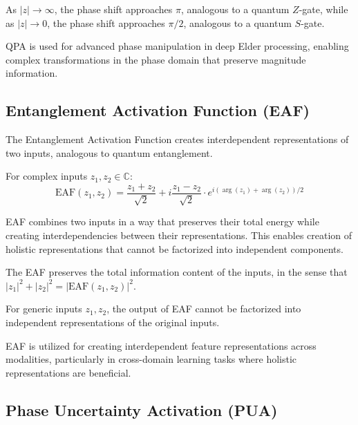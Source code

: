 \begin{observation}
As $|z| \to \infty$, the phase shift approaches $\pi$, analogous to a quantum $Z$-gate, while as $|z| \to 0$, the phase shift approaches $\pi/2$, analogous to a quantum $S$-gate.
\end{observation}

QPA is used for advanced phase manipulation in deep Elder processing, enabling complex transformations in the phase domain that preserve magnitude information.

\subsection{Entanglement Activation Function (EAF)}

The Entanglement Activation Function creates interdependent representations of two inputs, analogous to quantum entanglement.

\begin{definition}
For complex inputs $z_1, z_2 \in \mathbb{C}$:
\begin{equation}
\text{EAF}(z_1, z_2) = \frac{z_1 + z_2}{\sqrt{2}} + i\frac{z_1 - z_2}{\sqrt{2}} \cdot e^{i(\arg(z_1) + \arg(z_2))/2}
\end{equation}
\end{definition}

EAF combines two inputs in a way that preserves their total energy while creating interdependencies between their representations. This enables creation of holistic representations that cannot be factorized into independent components.

\begin{theorem}
The EAF preserves the total information content of the inputs, in the sense that $|z_1|^2 + |z_2|^2 = |\text{EAF}(z_1,z_2)|^2$.
\end{theorem}

\begin{theorem}
For generic inputs $z_1, z_2$, the output of EAF cannot be factorized into independent representations of the original inputs.
\end{theorem}

EAF is utilized for creating interdependent feature representations across modalities, particularly in cross-domain learning tasks where holistic representations are beneficial.

\subsection{Phase Uncertainty Activation (PUA)}

